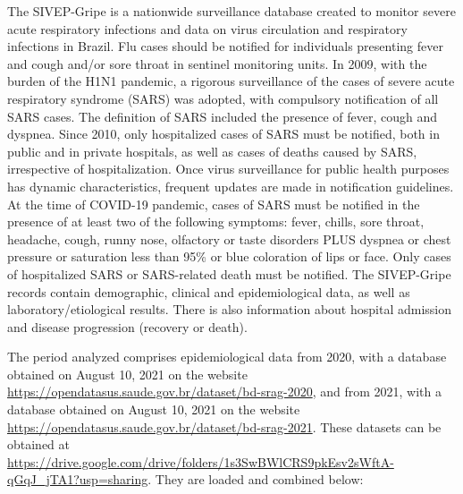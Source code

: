 \documentclass[
]{article}
\begin{document}
The SIVEP-Gripe is a nationwide surveillance database created to monitor
severe acute respiratory infections and data on virus circulation and
respiratory infections in Brazil. Flu cases should be notified for
individuals presenting fever and cough and/or sore throat in sentinel
monitoring units. In 2009, with the burden of the H1N1 pandemic, a
rigorous surveillance of the cases of severe acute respiratory syndrome
(SARS) was adopted, with compulsory notification of all SARS cases. The
definition of SARS included the presence of fever, cough and dyspnea.
Since 2010, only hospitalized cases of SARS must be notified, both in
public and in private hospitals, as well as cases of deaths caused by
SARS, irrespective of hospitalization. Once virus surveillance for
public health purposes has dynamic characteristics, frequent updates are
made in notification guidelines. At the time of COVID-19 pandemic, cases
of SARS must be notified in the presence of at least two of the
following symptoms: fever, chills, sore throat, headache, cough, runny
nose, olfactory or taste disorders PLUS dyspnea or chest pressure or
saturation less than 95\% or blue coloration of lips or face. Only cases
of hospitalized SARS or SARS-related death must be notified. The
SIVEP-Gripe records contain demographic, clinical and epidemiological
data, as well as laboratory/etiological results. There is also
information about hospital admission and disease progression (recovery
or death).

The period analyzed comprises epidemiological data from 2020, with a
database obtained on August 10, 2021 on the website
\url{https://opendatasus.saude.gov.br/dataset/bd-srag-2020}, and from
2021, with a database obtained on August 10, 2021 on the website
\url{https://opendatasus.saude.gov.br/dataset/bd-srag-2021}. These
datasets can be obtained at
\url{https://drive.google.com/drive/folders/1s3SwBWlCRS9pkEsv2sWftA-qGqJ_jTA1?usp=sharing}.
They are loaded and combined below:
\end{document}
